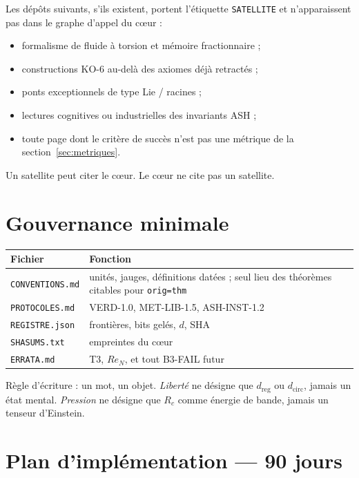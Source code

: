 \documentclass[11pt,a4paper]{article}
\theoremstyle{definition}
\begin{document}
Les dépôts suivants, s'ils existent, portent l'étiquette \texttt{SATELLITE} et n'apparaissent pas dans le graphe d'appel du cœur :
\begin{itemize}
  \item formalisme de fluide à torsion et mémoire fractionnaire ;
  \item constructions KO-6 au-delà des axiomes déjà retractés ;
  \item ponts exceptionnels de type Lie / racines ;
  \item lectures cognitives ou industrielles des invariants ASH ;
  \item toute page dont le critère de succès n'est pas une métrique de la section~\ref{sec:metriques}.
\end{itemize}
Un satellite peut citer le cœur. Le cœur ne cite pas un satellite.

\section{Gouvernance minimale}

{\small
\begin{tabular}{@{}p{38mm}p{115mm}@{}}
\toprule
\textbf{Fichier} & \textbf{Fonction} \\
\midrule
\texttt{CONVENTIONS.md} &
unités, jauges, définitions datées ; seul lieu des théorèmes citables pour \texttt{orig=thm} \\
\texttt{PROTOCOLES.md} &
VERD-1.0, MET-LIB-1.5, ASH-INST-1.2 \\
\texttt{REGISTRE.json} &
frontières, bits gelés, \(d\), SHA \\
\texttt{SHASUMS.txt} &
empreintes du cœur \\
\texttt{ERRATA.md} &
T3, \(Re_N\), et tout B3-FAIL futur \\
\bottomrule
\end{tabular}
}

\vspace{0.6em}
Règle d'écriture : un mot, un objet. \emph{Liberté} ne désigne que \(d_{\mathrm{reg}}\) ou \(d_{\mathrm{circ}}\), jamais un état mental. \emph{Pression} ne désigne que \(R_c\) comme énergie de bande, jamais un tenseur d'Einstein.

\section{Plan d'implémentation --- 90 jours}
\end{document}
